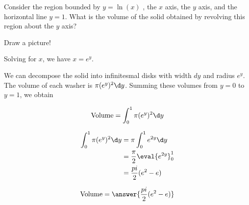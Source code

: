 \documentclass{ximera}
\author{Steven Gubkin}
\begin{document}
\begin{exercise}



Consider the region bounded by $y =\ln(x)$ , the $x$ axis, the $y$ axis, and the horizontal line $y=1$.  What is the volume of the solid obtained by revolving this region about the $y$ axis?


\begin{hint}
	Draw a picture!
\end{hint}

\begin{hint}
	Solving for $x$, we have $x = e^y$.  
\end{hint}

\begin{hint}
	We can decompose the solid into infinitesmal disks with width $dy$ and radius $e^y$.  The volume of each washer is $\pi (e^y)^2\d y$.  Summing these volumes from $y=0$ to $y=1$, we obtain

	\[
	\textrm{Volume} = \int_0^1 \pi (e^y)^2\d y
	\]
\end{hint}

\begin{hint}
	\begin{align*}
		 \int_0^1 \pi (e^y)^2\d y &= \pi \int_0^1e^{2y}\d y \\
			&=\frac{\pi}{2}\eval{e^{2y}}_0^1\\
			&=\frac{pi}{2}(e^2-e)
	\end{align*}
\end{hint}

\begin{prompt}
	\[
		\textrm{Volume} = \answer{\frac{pi}{2}(e^2-e)}
	\]
\end{prompt}

\end{exercise}
\end{document}
